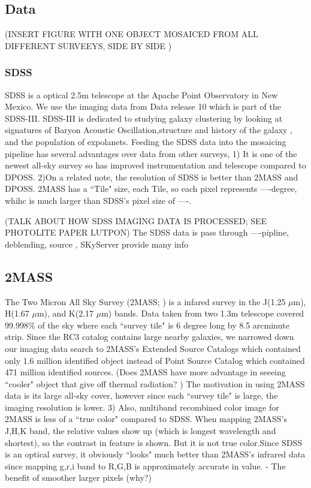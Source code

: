 \documentclass[5p]{elsarticle}
\begin{document}
\subsection{Data}
(INSERT FIGURE WITH ONE OBJECT MOSAICED FROM ALL DIFFERENT SURVEEYS, SIDE BY SIDE )
	\subsubsection{SDSS}
	SDSS is a optical 
	2.5m telescope at the Apache Point Observatory in New Mexico. We use the imaging data from Data release 10 which is part of the SDSS-III. SDSS-III is dedicated to studying galaxy clustering by looking at signatures of Baryon Acoustic Oscillation,structure and history of the galaxy , and the population of expolanets. Feeding the SDSS data into the mosaicing pipeline has several advantages over data from other surveys, 
1) It is  one of the newest all-sky survey so has improved instrumentation and telescope compared to DPOSS. 
2)On a related note, the resolution of SDSS is better than 2MASS and DPOSS.  2MASS has a ``Tile" size, each Tile, so each pixel represents ----degree, whihc is much larger than  SDSS's pixel size of ----. 
	
(TALK ABOUT HOW SDSS IMAGING DATA IS PROCESSED; SEE PHOTOLITE PAPER LUTPON) 	 The SDSS data is pass through ----pipline, deblending, source , 
	SKyServer provide many info
	

	\subsection{2MASS}
	 The Two Micron All Sky Survey (2MASS; \citet{2mass}) is a infared survey in the J(1.25 $\mu$m), H(1.67 $\mu$m), and K(2.17 $\mu$m) bands. Data taken from two 1.3m telescope  covered 99.998\% of the sky where each ``survey tile" is 6 degree long by 8.5 arcminute strip. Since the RC3 catalog contains large nearby galaxies, we narrowed down our imaging data search to  2MASS's  Extended Source Catalogs which contained only 1.6 million identified object instead of Point Source Catalog which contained 471 million identified sources. (Does 2MASS have more advantage in seeeing ``cooler" object that give off thermal radiation? ) The motivation in using 2MASS data is its large all-sky cover, however since each ``survey tile" is large, the imaging resolution is lower. 3) Also, multiband recombined color image for 2MASS is less of a ``true color" compared to SDSS. When mapping 2MASS's J,H,K band, the relative values show up (which is longest wavelength and shortest), so the contrast in feature is shown. But it is not true color.Since  SDSS is an optical survey, it obviously ``looks" much better than 2MASS's infrared data since mapping g,r,i band to R,G,B is approximately accurate in value. 
 - The benefit of smoother larger pixels (why?)
\end{document}
